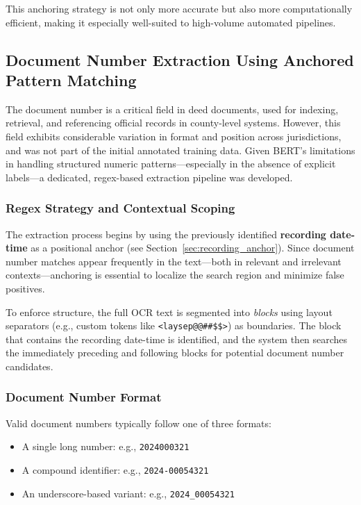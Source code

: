 \documentclass{article}
\begin{document}
This anchoring strategy is not only more accurate but also more computationally efficient, making it especially well-suited to high-volume automated pipelines.

\subsection{Document Number Extraction Using Anchored Pattern Matching}

The document number is a critical field in deed documents, used for indexing, retrieval, and referencing official records in county-level systems. However, this field exhibits considerable variation in format and position across jurisdictions, and was not part of the initial annotated training data. Given BERT’s limitations in handling structured numeric patterns—especially in the absence of explicit labels—a dedicated, regex-based extraction pipeline was developed.

\subsubsection{Regex Strategy and Contextual Scoping}

The extraction process begins by using the previously identified \textbf{recording date-time} as a positional anchor (see Section~\ref{sec:recording_anchor}). Since document number matches appear frequently in the text—both in relevant and irrelevant contexts—anchoring is essential to localize the search region and minimize false positives.

To enforce structure, the full OCR text is segmented into \textit{blocks} using layout separators (e.g., custom tokens like \texttt{<laysep@@\#\#\$\$>}) as boundaries. The block that contains the recording date-time is identified, and the system then searches the immediately preceding and following blocks for potential document number candidates.

\subsubsection{Document Number Format}

Valid document numbers typically follow one of three formats:

\begin{itemize}
    \item A single long number: e.g., \texttt{2024000321}
    \item A compound identifier: e.g., \texttt{2024-00054321}
    \item An underscore-based variant: e.g., \texttt{2024\_00054321}
\end{itemize}
\end{document}
